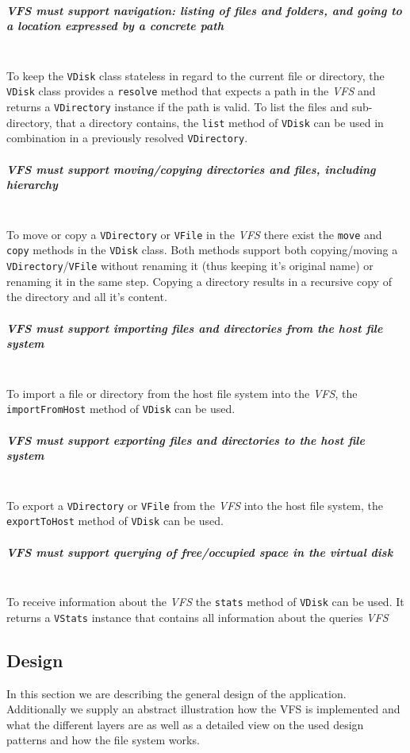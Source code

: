 \documentclass[a4paper,12pt]{article}
\begin{document}
\subparagraph{\emph{VFS} must support navigation: listing of files and folders, and going to a location expressed by a concrete path} \hfill\\
To keep the \texttt{VDisk} class stateless in regard to the current file or directory, the \texttt{VDisk} class provides a \texttt{resolve} method that expects a path in the \emph{VFS} and returns a \texttt{VDirectory} instance if the path is valid. To list the files and sub-directory, that a directory contains, the \texttt{list} method of \texttt{VDisk} can be used in combination in a previously resolved \texttt{VDirectory}.

\subparagraph{\emph{VFS} must support moving/copying directories and files, including hierarchy} \hfill\\
To move or copy a \texttt{VDirectory} or \texttt{VFile} in the \emph{VFS} there exist the \texttt{move} and \texttt{copy} methods in the \texttt{VDisk} class. Both methods support both copying/moving a \texttt{VDirectory}/\texttt{VFile} without renaming it (thus keeping it's original name) or renaming it in the same step. Copying a directory results in a recursive copy of the directory and all it's content.

\subparagraph{\emph{VFS} must support importing files and directories from the host file system} \hfill\\
To import a file or directory from the host file system into the \emph{VFS}, the \texttt{importFromHost} method of \texttt{VDisk} can be used.

\subparagraph{\emph{VFS} must support exporting files and directories to the host file system} \hfill\\
To export a \texttt{VDirectory} or \texttt{VFile} from the \emph{VFS} into the host file system, the \texttt{exportToHost} method of \texttt{VDisk} can be used.

\subparagraph{\emph{VFS} must support querying of free/occupied space in the virtual disk} \hfill\\
To receive information about the \emph{VFS} the \texttt{stats} method of \texttt{VDisk} can be used. It returns a \texttt{VStats} instance that contains all information about the queries \emph{VFS}

\subsection{Design}

In this section we are describing the general design of the application. Additionally we supply an abstract illustration how the VFS is implemented and what the different layers are as well as a detailed view on the used design patterns and how the file system works.
\end{document}
